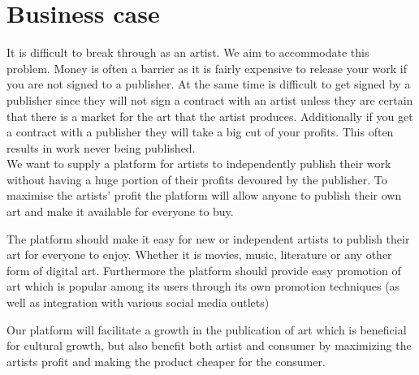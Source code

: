 \documentclass[../report.tex]{subfiles}
\begin{document}
\section{Business case}

It is difficult to break through as an artist. We aim to accommodate this problem. Money is often a barrier as it is fairly expensive to release your work if you are not signed to a publisher. At the same time is difficult to get signed by a publisher since they will not sign a contract with an artist unless they are certain that there is a market for the art that the artist produces. Additionally if you get a contract with a publisher they will take a big cut of your profits. This often results in work never being published.\\

We want to supply a platform for artists to independently publish their work without having a huge portion of their profits devoured by the publisher. To maximise the artists' profit the platform will allow anyone to publish their own art and make it available for everyone to buy.

The platform should make it easy for new or independent artists to publish their art for everyone to enjoy. Whether it is movies, music, literature or any other form of digital art. Furthermore the platform should provide easy promotion of art which is popular among its users through its own promotion techniques (as well as integration with various social media outlets)

Our platform will facilitate a growth in the publication of art which is beneficial for cultural growth, but also benefit both artist and consumer by maximizing the artists profit and making the product cheaper for the consumer. 
\end{document}
